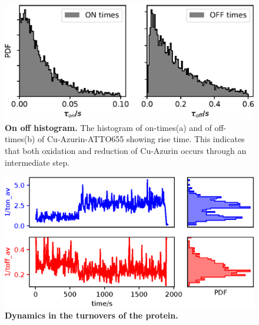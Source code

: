 \documentclass[journal=jacsat,manuscript=article]{achemso}
\begin{document}
\begin{figure}
	\includegraphics[width=\textwidth]{Figure/Figure_3_on_off_1D.eps}
	\caption{\textbf{On off histogram.} The histogram of on-times(a) and of off-times(b) of Cu-Azurin-ATTO655 showing rise time. This indicates that both oxidation and reduction of Cu-Azurin occurs through an intermediate step.}
	\label{fig:onoff1D}
\end{figure}
\begin{figure}
	\includegraphics[width=\textwidth]{Figure/dynamic_rates.eps}
	\caption{\textbf{Dynamics in the turnovers of the protein.}}
	\label{fig:dynamic_rates}
\end{figure}
\end{document}
